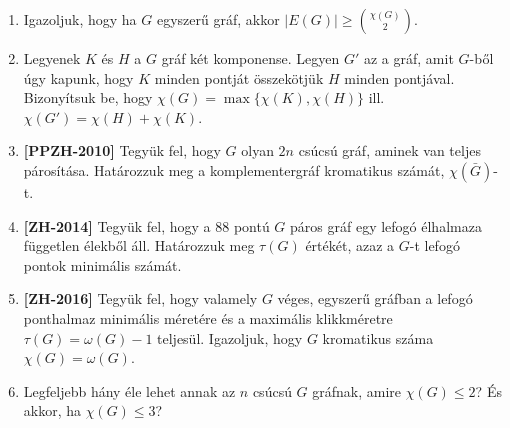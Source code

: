 \documentclass[a4paper, 12pt]{article}
\begin{document}
\begin{enumerate}
            \item Igazoljuk, hogy ha $G$ egyszerű gráf, akkor $|E(G)|\geq \binom{\chi(G)}{2}$.
            
            \item Legyenek $K$ és $H$ a $G$ gráf két komponense. Legyen $G'$ az a gráf, amit $G$-ből úgy kapunk, hogy $K$ minden pontját összekötjük $H$ minden pontjával. Bizonyítsuk be, hogy $\chi(G)=\max\{\chi(K),\chi(H)\}$ ill. $\chi(G')=\chi(H)+\chi(K)$.
            
            \item \textbf{[PPZH-2010]} Tegyük fel, hogy $G$ olyan $2n$ csúcsú gráf, aminek van teljes párosítása. Határozzuk meg a komplementergráf kromatikus számát, $\chi(\bar{G})$-t.
            
            \item \textbf{[ZH-2014]} Tegyük fel, hogy a $88$ pontú $G$ páros gráf egy lefogó élhalmaza független élekből áll. Határozzuk meg $\tau(G)$ értékét, azaz a $G$-t lefogó pontok minimális számát.
            
            \item \textbf{[ZH-2016]} Tegyük fel, hogy valamely $G$ véges, egyszerű gráfban a lefogó ponthalmaz minimális méretére és a maximális klikkméretre $\tau(G)=\omega(G)-1$ teljesül. Igazoljuk, hogy $G$ kromatikus száma $\chi(G) = \omega(G)$.
            
            \item Legfeljebb hány éle lehet annak az $n$ csúcsú $G$ gráfnak, amire $\chi(G)\leq 2$? És akkor, ha $\chi(G)\leq 3$?
            

\end{enumerate}
\end{document}
